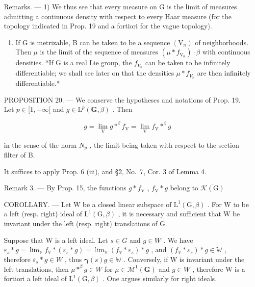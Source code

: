 Remarks. --- 1) We thus see that every measure on G is the limit of measures admitting a continuous density with respect to every Haar measure (for the topology indicated in Prop. 19 and a fortiori for the vague topology).

\begin{enumerate}
\def\labelenumi{\arabic{enumi})}
\setcounter{enumi}{1}
\tightlist
\item
  If G is metrizable, B can be taken to be a sequence \((\mathrm{V}_{n})\) of neighborhoods. Then \(\mu\) is the limit of the sequence of measures \((\mu * f_{\mathrm{V}_{n}}) \cdot \beta\) with continuous densities. *If G is a real Lie group, the \(f_{V_{n}}\) can be taken to be infinitely differentiable; we shall see later on that the densities \(\mu * f_{V_{n}}\) are then infinitely differentiable.*
\end{enumerate}

PROPOSITION 20. --- We conserve the hypotheses and notations of Prop. 19. Let \(p \in [1, +\infty[\) and \(g \in \mathrm{L}^p(\mathbf{G}, \beta)\) . Then

\[
g = \lim _ {\mathrm{V}} g * ^ {\beta} f _ {\mathrm{V}} = \lim _ {\mathrm{V}} f _ {\mathrm{V}} * ^ {\beta} g
\]

in the sense of the norm \(N_{p}\) , the limit being taken with respect to the section filter of B.

It suffices to apply Prop. 6 (iii), and §2, No.~7, Cor. 3 of Lemma 4.

Remark 3. --- By Prop. 15, the functions \(g * f_{\mathrm{V}}\) , \(f_{\mathrm{V}} * g\) belong to \(\overline{\mathcal{K}(\mathrm{G})}\)

COROLLARY. --- Let W be a closed linear subspace of \(\mathrm{L}^{1}(\mathrm{G},\beta)\) . For W to be a left (resp. right) ideal of \(\mathrm{L}^{1}(\mathrm{G},\beta)\) , it is necessary and sufficient that W be invariant under the left (resp. right) translations of G.

Suppose that W is a left ideal. Let \(s \in G\) and \(g \in W\) . We have \(\varepsilon_{s} * g = \lim_{\mathbb{V}} f_{\mathbb{V}} * (\varepsilon_{s} * g) = \lim_{\mathbb{V}} (f_{\mathbb{V}} * \varepsilon_{s}) * g\) , and \((f_{\mathbb{V}} * \varepsilon_{s}) * g \in \mathbb{W}\) , therefore \(\varepsilon_{s} * g \in W\) , thus \(\boldsymbol{\gamma}(s)g \in \mathbb{W}\) . Conversely, if W is invariant under the left translations, then \(\mu *^{\beta}g \in W\) for \(\mu \in \mathcal{M}^{1}(\mathbf{G})\) and \(g \in W\) , therefore W is a fortiori a left ideal of \(\mathrm{L}^{1}(\mathrm{G}, \beta)\) . One argues similarly for right ideals.

